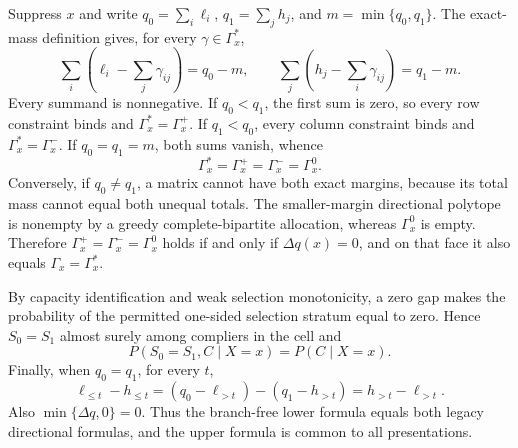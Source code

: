 Suppress \(x\) and write \(q_0=\sum_i\ell_i\), \(q_1=\sum_jh_j\), and \(m=\min\{q_0,q_1\}\).  The exact-mass definition gives, for every \(\gamma\in\Gamma_x^{\ast}\),
\[
\sum_i\left(\ell_i-\sum_j\gamma_{ij}\right)=q_0-m,
\qquad
\sum_j\left(h_j-\sum_i\gamma_{ij}\right)=q_1-m.
\]
Every summand is nonnegative.  If \(q_0<q_1\), the first sum is zero, so every row constraint binds and \(\Gamma_x^{\ast}=\Gamma_x^+\).  If \(q_1<q_0\), every column constraint binds and \(\Gamma_x^{\ast}=\Gamma_x^-\).  If \(q_0=q_1=m\), both sums vanish, whence
\[
\Gamma_x^{\ast}=\Gamma_x^+=\Gamma_x^-=\Gamma_x^0.
\]
Conversely, if \(q_0\ne q_1\), a matrix cannot have both exact margins, because its total mass cannot equal both unequal totals.  The smaller-margin directional polytope is nonempty by a greedy complete-bipartite allocation, whereas \(\Gamma_x^0\) is empty.  Therefore \(\Gamma_x^+=\Gamma_x^-=\Gamma_x^0\) holds if and only if \(\Delta q(x)=0\), and on that face it also equals \(\Gamma_x=\Gamma_x^{\ast}\).

By capacity identification and weak selection monotonicity, a zero gap makes the probability of the permitted one-sided selection stratum equal to zero.  Hence \(S_0=S_1\) almost surely among compliers in the cell and
\[
P(S_0=S_1,C\mid X=x)=P(C\mid X=x).
\]
Finally, when \(q_0=q_1\), for every \(t\),
\[
\ell_{\le t}-h_{\le t}
=(q_0-\ell_{>t})-(q_1-h_{>t})
=h_{>t}-\ell_{>t}.
\]
Also \(\min\{\Delta q,0\}=0\).  Thus the branch-free lower formula equals both legacy directional formulas, and the upper formula is common to all presentations.